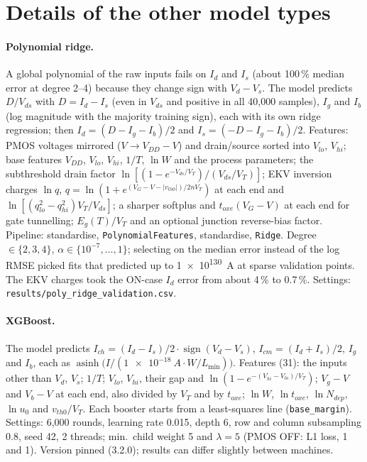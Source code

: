 \documentclass[11pt,a4paper]{article}
\begin{document}
\section{Details of the other model types}
\label{app:models}
\paragraph{Polynomial ridge.} A global polynomial of the raw inputs fails on $I_d$ and $I_s$ (about
100\,\% median error at degree 2--4) because they change sign with $V_d-V_s$. The model predicts
$D/V_{ds}$ with $D = I_d - I_s$ (even in $V_{ds}$ and positive in all 40{,}000 samples), $I_g$ and $I_b$
(log magnitude with the majority training sign), each with its own ridge regression; then
$I_d = (D - I_g - I_b)/2$ and $I_s = (-D - I_g - I_b)/2$. Features: PMOS voltages mirrored
($V \to V_{DD} - V$) and drain/source sorted into $V_{lo}$, $V_{hi}$; base features $V_{DD}$, $V_{lo}$,
$V_{hi}$, $1/T$, $\ln W$ and the process parameters; the subthreshold drain factor
$\ln[(1-e^{-V_{ds}/V_T})/(V_{ds}/V_T)]$; EKV inversion charges $\ln q$,
$q=\ln(1+e^{(V_G - V - |v_{th0}|)/2nV_T})$ at each end and $\ln[(q_{lo}^2-q_{hi}^2)V_T/V_{ds}]$; a sharper
softplus and $t_{oxe}(V_G - V)$ at each end for gate tunnelling; $E_g(T)/V_T$ and an optional junction
reverse-bias factor. Pipeline: standardise, \texttt{PolynomialFeatures}, standardise, \texttt{Ridge}.
Degree $\in\{2,3,4\}$, $\alpha \in \{10^{-7},\dots,1\}$; selecting on the median error instead of the
log RMSE picked fits that predicted up to \SI{1e130}{A} at sparse validation points. The EKV charges took
the ON-case $I_d$ error from about 4\,\% to 0.7\,\%. Settings: \texttt{results/poly\_ridge\_validation.csv}.

\paragraph{XGBoost.} The model predicts $I_{ch} = (I_d - I_s)/2 \cdot \operatorname{sign}(V_d - V_s)$,
$I_{cm} = (I_d + I_s)/2$, $I_g$ and $I_b$, each as $\operatorname{asinh}\bigl(I / (\SI{1e-18}{A}\cdot W/L_{\min})\bigr)$.
Features (31): the inputs other than $V_d$, $V_s$; $1/T$; $V_{lo}$, $V_{hi}$, their gap and
$\ln(1 - e^{-(V_{hi}-V_{lo})/V_T})$; $V_g - V$ and $V_b - V$ at each end, also divided by $V_T$ and by
$t_{oxe}$; $\ln W$, $\ln t_{oxe}$, $\ln N_{dep}$, $\ln u_0$ and $v_{th0}/V_T$. Each booster starts from a
least-squares line (\texttt{base\_margin}). Settings: 6{,}000 rounds, learning rate 0.015, depth 6, row
and column subsampling 0.8, seed 42, 2 threads; min.\ child weight 5 and $\lambda = 5$ (PMOS OFF: L1
loss, 1 and 1). Version pinned (3.2.0); results can differ slightly between machines.
\end{document}

